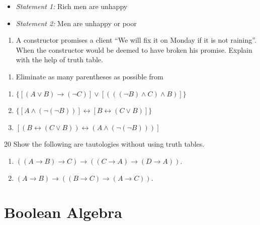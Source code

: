 \documentclass[]{book}
\providecommand{\tightlist}{%
  \setlength{\itemsep}{0pt}\setlength{\parskip}{0pt}}
\begin{document}
\begin{itemize}
\item
  \emph{Statement 1:} Rich men are unhappy
\item
  \emph{Statement 2:} Men are unhappy or poor
\end{itemize}

\begin{enumerate}
\def\labelenumi{\arabic{enumi}.}
\setcounter{enumi}{17}
\tightlist
\item
  A constructor promises a client ``We will fix it on Monday if it is not raining''. When the constructor would be deemed to have broken his promise. Explain with the help of truth table.
\end{enumerate}

\begin{enumerate}
\def\labelenumi{\arabic{enumi}.}
\setcounter{enumi}{18}
\tightlist
\item
  Eliminate as many parentheses as possible from
\end{enumerate}

\begin{enumerate}
\def\labelenumi{\alph{enumi})}
\tightlist
\item
  \(\{[(A \lor B)\rightarrow (\lnot C)] \lor [(((\lnot B)\land C)\land B)]\}\)
\item
  \(\{[A \land (\lnot (\lnot B))]\leftrightarrow [B \leftrightarrow (C \lor B)]\}\)
\item
  \([(B\leftrightarrow (C \lor B)) \leftrightarrow (A \land (\lnot (\lnot B)))]\)
\end{enumerate}

20 Show the following are tautologies without using truth tables.

\begin{enumerate}
\def\labelenumi{\alph{enumi})}
\tightlist
\item
  \(((A \rightarrow B) \rightarrow C) \rightarrow ((C \rightarrow A) \rightarrow(D \rightarrow A )).\)
\item
  \((A \rightarrow B)\rightarrow ((B \rightarrow C) \rightarrow (A \rightarrow C)).\)
\end{enumerate}

\hypertarget{boolean-algebra}{%
\chapter{Boolean Algebra}\label{boolean-algebra}}

\end{document}
